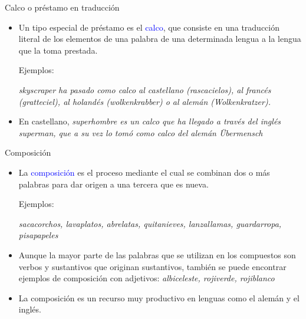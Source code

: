 \documentclass{beamer}
\begin{document}
\begin{frame}{Calco o préstamo en traducción}

\begin{itemize}
    \item Un tipo especial de préstamo es el \textcolor{blue}{calco}, que consiste en una traducción literal de los elementos de una palabra de una determinada lengua a la lengua que la toma prestada.

    Ejemplos: 
    
    \it{skyscraper} ha pasado como calco al castellano (\it{rascacielos}), al francés (\it{gratteciel}), al holandés (\it{wolkenkrabber}) o al alemán (\it{Wolkenkratzer}).
    
    \item En castellano, \it{superhombre} es un calco que ha llegado a través del inglés \it{superman}, que a su vez lo tomó como calco del alemán \it{Übermensch}
    
\end{itemize}

\end{frame}

\begin{frame}{Composición}

\begin{itemize}
	\item La \textcolor{blue}{composición} es el proceso mediante el cual se combinan dos o más palabras para dar origen a una tercera que es nueva.
	
	Ejemplos: 
	
	\it{sacacorchos, lavaplatos, abrelatas, quitanieves, lanzallamas, guardarropa, pisapapeles}
	
	\item Aunque la mayor parte de las palabras que se utilizan en los compuestos son verbos y sustantivos que originan sustantivos, también se puede encontrar ejemplos de composición con adjetivos: \it{albiceleste, rojiverde, rojiblanco}
	
	\item La composición es un recurso muy productivo en lenguas como el alemán y el inglés.
\end{itemize}

\end{frame}
\end{document}
